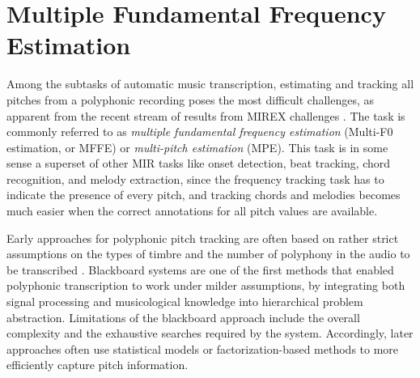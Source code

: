 \section{Multiple Fundamental Frequency Estimation}\label{sec:mffe}

Among the subtasks of automatic music transcription, estimating and tracking all pitches from a polyphonic recording poses the most difficult challenges, as apparent from the recent stream of results from MIREX challenges \cite{downie2014mirex}.
The task is commonly referred to as \emph{multiple fundamental frequency estimation} (Multi-F0 estimation, or MFFE) or \emph{multi-pitch estimation} (MPE).
This task is in some sense a superset of other MIR tasks like onset detection, beat tracking, chord recognition, and melody extraction,
since the frequency tracking task has to indicate the presence of every pitch, and tracking chords and melodies becomes much easier when the correct annotations for all pitch values are available.



Early approaches for polyphonic pitch tracking are often based on rather strict assumptions on the types of timbre and the number of polyphony in the audio to be transcribed \cite{moorer1977transcription,piszczalski1977transcription}. Blackboard systems \cite{martin1996blackboard,dixon2000piano} are one of the first methods that enabled polyphonic transcription to work under milder assumptions, by integrating both signal processing and musicological knowledge into hierarchical problem abstraction. Limitations of the blackboard approach include the overall complexity and the exhaustive searches required by the system. Accordingly, later approaches often use statistical models or factorization-based methods to more efficiently capture pitch information.



